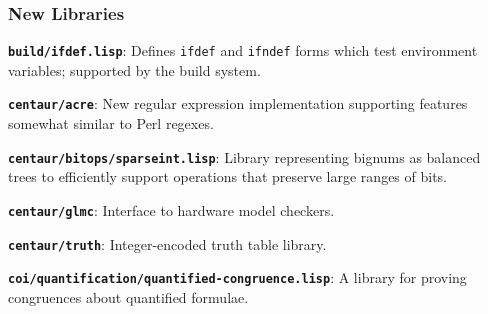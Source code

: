 \documentclass{beamer}
\newcommand{\code}[1]{\texttt{#1}}
\newcommand{\bookpath}[1]{\textbf{\code{#1}}}
\newcommand{\newlibtitle}{\frametitle{New Libraries}}
\newcommand{\separation}{\vspace*{1ex}}
\begin{document}














\begin{frame}

\newlibtitle

\bookpath{build/ifdef.lisp}:
Defines \code{ifdef} and \code{ifndef} forms which test environment variables;
supported by the build system.

\separation

\bookpath{centaur/acre}:
New regular expression implementation supporting features somewhat similar to Perl regexes.

\separation

\bookpath{centaur/bitops/sparseint.lisp}:
Library representing bignums as balanced trees to efficiently support
operations that preserve large ranges of bits.

\separation

\bookpath{centaur/glmc}:
Interface to hardware model checkers.

\separation

\bookpath{centaur/truth}:
Integer-encoded truth table library.

\separation

\bookpath{coi/quantification/quantified-congruence.lisp}:
A library for proving congruences about quantified formulae.

\end{frame}
\end{document}
